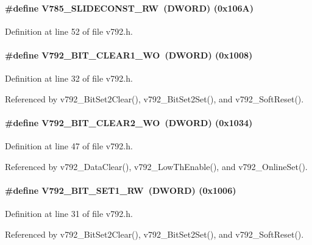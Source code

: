 \paragraph[{V785\_\-SLIDECONST\_\-RW}]{\setlength{\rightskip}{0pt plus 5cm}\#define V785\_\-SLIDECONST\_\-RW~({\bf DWORD}) (0x106A)}\hfill\label{v792_8h_a111bde672be15d08a847ace15f299342}


Definition at line 52 of file v792.h.
\paragraph[{V792\_\-BIT\_\-CLEAR1\_\-WO}]{\setlength{\rightskip}{0pt plus 5cm}\#define V792\_\-BIT\_\-CLEAR1\_\-WO~({\bf DWORD}) (0x1008)}\hfill\label{v792_8h_a3cf53e955ca3eeb47fd7b00b374bdcd2}


Definition at line 32 of file v792.h.

Referenced by v792\_\-BitSet2Clear(), v792\_\-BitSet2Set(), and v792\_\-SoftReset().
\paragraph[{V792\_\-BIT\_\-CLEAR2\_\-WO}]{\setlength{\rightskip}{0pt plus 5cm}\#define V792\_\-BIT\_\-CLEAR2\_\-WO~({\bf DWORD}) (0x1034)}\hfill\label{v792_8h_a3823a4fb90f9cfec8090b778e8b9aa32}


Definition at line 47 of file v792.h.

Referenced by v792\_\-DataClear(), v792\_\-LowThEnable(), and v792\_\-OnlineSet().
\paragraph[{V792\_\-BIT\_\-SET1\_\-RW}]{\setlength{\rightskip}{0pt plus 5cm}\#define V792\_\-BIT\_\-SET1\_\-RW~({\bf DWORD}) (0x1006)}\hfill\label{v792_8h_ac6a8024cddfc9385e0ae13e5f96ee339}


Definition at line 31 of file v792.h.

Referenced by v792\_\-BitSet2Clear(), v792\_\-BitSet2Set(), and v792\_\-SoftReset().
